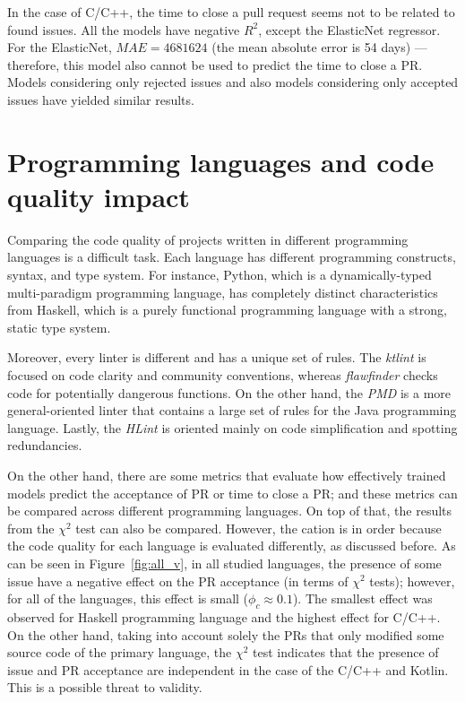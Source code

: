 \documentclass[digital,oneside,oldtable,nolof,nolot,nocover]{fithesis4}
\begin{document}
In the case of C/C++, the time to close a pull request seems not to be related
to found issues.  All the models have negative \(R^2\), except the ElasticNet
regressor. For the ElasticNet, \(MAE = 4681624\) (the mean absolute error is 54
days) --- therefore, this model also cannot be used to predict the time to
close a PR.  Models considering only rejected issues and also models
considering only accepted issues have yielded similar results.
\section{Programming languages and code quality impact}
\label{sec:orgf8be2ca}
Comparing the code quality of projects written in different programming
languages is a difficult task.  Each language has different programming
constructs, syntax, and type system. For instance, Python, which is
a dynamically-typed multi-paradigm programming language, has completely
distinct characteristics from Haskell, which is a purely functional programming
language with a strong, static type system.

Moreover, every linter is different and has a unique set of rules.  The
\emph{ktlint} is focused on code clarity and community conventions, whereas
\emph{flawfinder} checks code for potentially dangerous functions. On the other
hand, the \emph{PMD} is a more general-oriented linter that contains a large set of
rules for the Java programming language. Lastly, the \emph{HLint} is oriented mainly
on code simplification and spotting redundancies.

On the other hand, there are some metrics that evaluate how effectively
trained models predict the acceptance of PR or time to close a PR;
and these metrics can be compared across different programming languages.
On top of that, the results from the \(\chi^2\) test can also be compared.
However, the cation is in order because the code quality for each language is
evaluated differently, as discussed before.
As can be seen in Figure~\ref{fig:all_v}, in all studied languages, the
presence of some issue have a negative effect on the PR acceptance (in terms
of \(\chi^2\) tests); however, for all of the languages, this effect is small (\(\phi_c
   \approx 0.1\)).  The smallest effect was observed for Haskell programming
language and the highest effect for C/C++.  On the other hand,
taking into account solely the PRs that only modified some source code of the
primary language, the \(\chi^2\) test indicates that the presence of issue and PR
acceptance are independent in the case of the C/C++ and Kotlin. This is a possible
threat to validity.
\end{document}
